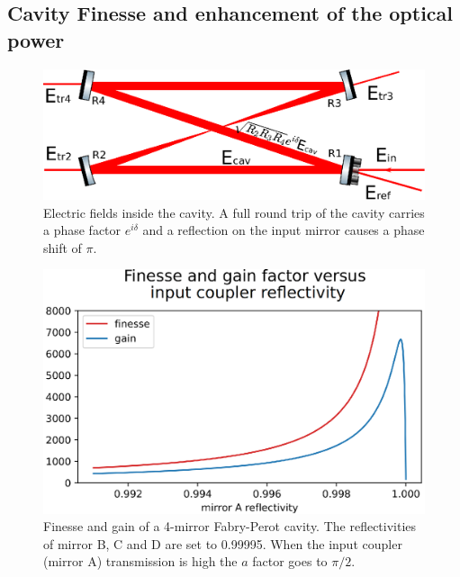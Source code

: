 \subsection{Cavity Finesse and enhancement of the optical power}
\begin{figure}
	\centering
	\includegraphics[width=0.9\linewidth]{images/ecav.eps}
	\caption{Electric fields inside the cavity. A full round trip of the cavity carries a phase factor $e^{i\delta}$ and a reflection on the input mirror causes a phase shift of $\pi$.}
	\label{fig:ecav}
\end{figure}
\begin{figure}
	\centering
	\includegraphics[width=0.9\linewidth]{images/finessegain.eps}
	\caption{Finesse and gain of a 4-mirror Fabry-Perot cavity. The reflectivities of mirror B, C and D are set to 0.99995. When the input coupler (mirror A) transmission is high the $a$ factor goes to $\pi/2$.}
	\label{fig:finessegain}
\end{figure}
